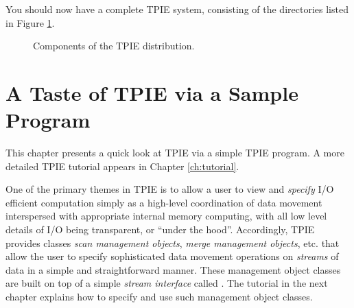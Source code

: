 You should now have a complete TPIE system, consisting of
the directories listed in Figure \ref{fig:components}.
\begin{figure}
\begin{center}
\begin{minipage}[hb]{1.0\linewidth}
\raggedright
{}
\caption{\label{fig:components} Components of the TPIE distribution.}
\end{minipage}
\end{center}
\end{figure}



\chapter{A Taste of TPIE via a Sample Program}
\label{ch:samplepgmr}

This chapter presents a quick look
at TPIE via a simple TPIE program. A more detailed TPIE
tutorial appears in Chapter \ref{ch:tutorial}. 

One of the primary themes in TPIE is to allow a user to view
and \emph{specify} I/O efficient computation simply as a
high-level coordination of data movement interspersed with
appropriate internal memory computing, with all low level
details of I/O being transparent, or ``under the hood''.
Accordingly, TPIE provides classes \emph{scan management
   objects}, \emph{merge management objects}, etc. that
allow the user to specify sophisticated data movement
operations on \emph{streams} of data in a simple and
straightforward manner. These management object classes are
built on top of a simple \emph{stream interface} called
. The tutorial in the next chapter explains
how to specify and use such management object classes.

